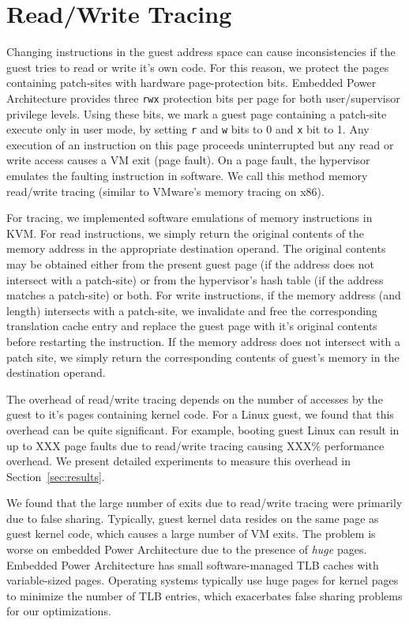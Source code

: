 \documentclass[10pt,twocolumn]{article}
\begin{document}
\section{Read/Write Tracing}
\label{sec:tracing}
Changing instructions in the guest address space can cause
inconsistencies if the guest tries to read or write it's own code.
For this reason, we protect the pages containing patch-sites with hardware
page-protection bits. Embedded Power Architecture provides three {\tt rwx}
protection bits per page for both user/supervisor privilege levels. Using these
bits, we mark a guest page containing a patch-site
execute only in user mode, by setting {\tt r} and {\tt w} bits to 0 and {\tt x} bit to 1.
Any execution of an instruction on this page proceeds uninterrupted
but any read or write access causes a VM exit (page fault).
On a page fault, the hypervisor
emulates the faulting instruction in software. We call this
method memory read/write tracing (similar to VMware's memory tracing
on x86\cite{agesen:comparison}).

For tracing, we implemented software emulations of memory instructions in KVM.
For read instructions, we simply return the original contents of the memory
address in the appropriate destination
operand. The original contents may be obtained either from the present guest
page (if the address does not intersect with a patch-site) or from the hypervisor's
hash table (if the address matches a patch-site) or both.
For write instructions, if the memory address (and length) intersects with a patch-site,
we invalidate and free the corresponding translation cache
entry and replace the guest page with it's original contents before
restarting the instruction. If the memory address does not intersect with a patch
site, we simply return the corresponding contents of guest's memory in the destination
operand.

The overhead of read/write tracing depends on the number of accesses by the guest
to it's pages containing kernel code. For a Linux guest, we found that this overhead
can be quite significant. For example, booting guest Linux can result in
up to XXX page faults due to read/write tracing causing XXX\% performance overhead.
We present detailed experiments to measure this overhead in Section~\ref{sec:results}.

We found that the large number of exits due to read/write tracing were primarily
due to false sharing. Typically, guest kernel data resides on the same page as
guest kernel code, which causes a large number of VM exits. The problem is
worse on embedded Power Architecture due to the presence of {\em huge} pages.
Embedded Power Architecture has small software-managed
TLB caches with variable-sized pages. Operating systems typically use huge pages for
kernel pages to
minimize the number of TLB entries, which exacerbates false sharing problems for
our optimizations.
\end{document}
